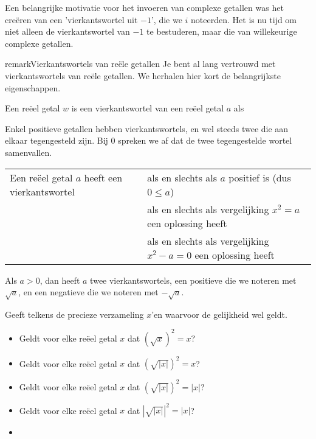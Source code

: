 \documentclass{ximera}
\begin{document}
	\author{Wim Obbels}
	\label{xim:cmplx_vierkantswortels}

    Een belangrijke motivatie voor het invoeren van complexe getallen was het creëren van een 'vierkantswortel uit $-1$', die we $i$ noteerden.
    Het is nu tijd om niet alleen de vierkantswortel van $-1$ te bestuderen, maar die van willekeurige complexe getallen.


    \begin{expandable}{remark}{Vierkantswortels van reële getallen}
        Je bent al lang vertrouwd met vierkantswortels van reële getallen. We herhalen hier kort de belangrijkste eigenschappen.

        \begin{definition}\nl

            Een reëel getal $w$ is een {vierkantswortel} van een reëel getal $a$ als 
        \end{definition}

        Enkel positieve getallen hebben vierkantswortels, en wel steeds twee die aan elkaar tegengesteld zijn. Bij $0$ spreken we af dat de twee tegengestelde wortel samenvallen.
        \begin{proposition}\nl

            \begin{tabular}{@{}l@{ }l}
            Een reëel getal $a$ heeft een vierkantswortel & als en slechts als $a$ positief is (dus $0\leq a$) \\
                                                          & als en slechts als vergelijking $x^2 = a$ een oplossing heeft \\
                                                          & als en slechts als vergelijking $x^2 - a = 0 $ een oplossing heeft 
            \end{tabular}

            Als $a>0$, dan heeft $a$ twee vierkantswortels, een positieve die we noteren met $\sqrt{a}$, en een negatieve die we noteren met $-\sqrt{a}$.
        \end{proposition}

        \begin{quickquestion*}
            Geeft telkens de precieze verzameling $x$'en waarvoor de gelijkheid wel geldt.
            \begin{itemize}
                \item Geldt voor elke reëel getal $x$ dat $(\sqrt{x})^2 = x$?
                \item Geldt voor elke reëel getal $x$ dat $(\sqrt{|x|})^2 = x$?
                \item Geldt voor elke reëel getal $x$ dat $(\sqrt{|x|})^2 = |x|$?
                \item Geldt voor elke reëel getal $x$ dat $|\sqrt{|x|}|^2 = |x|$?
                \item 
            \end{itemize}
         \end{quickquestion*}



\end{expandable}
\end{document}
